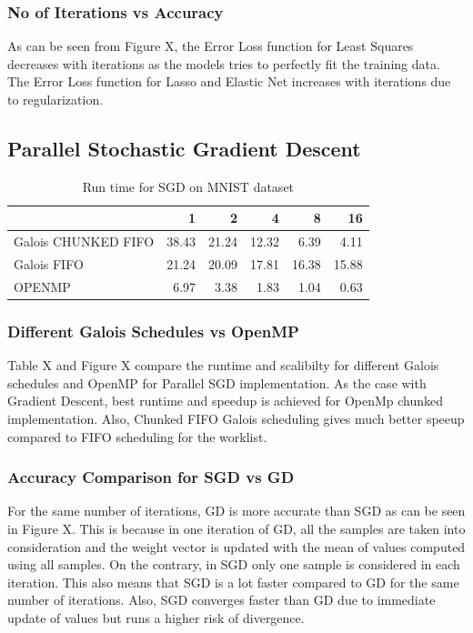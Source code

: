 \documentclass{sigplanconf}
\begin{document}
   	\subsubsection{No of Iterations vs Accuracy}
	As can be seen from Figure X, the Error Loss function for Least Squares decreases with iterations as the models
	tries to perfectly fit the training data. The Error Loss function for Lasso and Elastic Net increases with iterations
	due to regularization.

\subsection{Parallel Stochastic Gradient Descent}
\begin{table}[htbp]
\caption{Run time for SGD on MNIST dataset}
\begin{tabular}{|l|r|r|r|r|r|}
\hline
 & 1 & 2 & 4 & 8 & 16 \\ \hline
Galois CHUNKED FIFO & 38.43 & 21.24 & 12.32 & 6.39 & 4.11 \\ \hline
Galois FIFO & 21.24 & 20.09 & 17.81 & 16.38 & 15.88 \\ \hline
OPENMP & 6.97 & 3.38 & 1.83 & 1.04 & 0.63 \\ \hline
\end{tabular}
\label{Label of the table}
\end{table}

	\subsubsection{Different Galois Schedules vs OpenMP}
	Table X and Figure X compare the runtime and scalibilty for different Galois schedules and OpenMP for Parallel SGD
	implementation. As the case with Gradient Descent, best runtime and speedup is achieved for OpenMp chunked implementation.
	Also, Chunked FIFO Galois scheduling gives much better speeup compared to FIFO scheduling for the worklist.
	
	\subsubsection{Accuracy Comparison for SGD vs GD}
	For the same number of iterations, GD is more accurate than SGD as can be seen in Figure X. This is because in one iteration
	of GD, all the samples are taken into consideration and the weight vector is updated with the mean of values computed using all
	samples. On the contrary, in SGD only one sample is considered in each iteration. This also means that SGD is a lot faster compared
	to GD for the same number of iterations. Also, SGD converges faster than GD due to immediate update of values but runs a higher
	risk of divergence.
\end{document}
